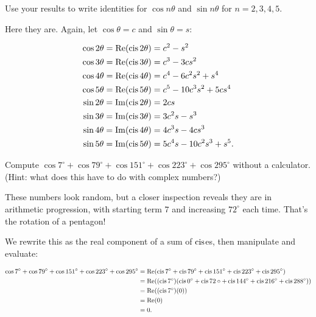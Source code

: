 \documentclass[../key.tex]{subfiles}
\begin{document}
\begin{inner_problem}
\item Use your results to write identities for $\cos n\theta$ and $\sin n\theta$ for $n=2,3,4,5$.
\end{inner_problem}

Here they are. Again, let $\cos\theta = c$ and $\sin\theta = s$:

\begin{align*}
\cos 2\theta = \operatorname{Re}(\operatorname{cis} 2\theta) &= c^2 - s^2 \\
\cos 3\theta = \operatorname{Re}(\operatorname{cis} 3\theta) &= c^3 - 3cs^2 \\
\cos 4\theta = \operatorname{Re}(\operatorname{cis} 4\theta) &= c^4 - 6c^2s^2 + s^4 \\
\cos 5\theta = \operatorname{Re}(\operatorname{cis} 5\theta) &= c^5 - 10c^3s^2 + 5cs^4 \\
\sin 2\theta = \operatorname{Im}(\operatorname{cis} 2\theta) &= 2cs \\
\sin 3\theta = \operatorname{Im}(\operatorname{cis} 3\theta) &= 3c^2s - s^3 \\
\sin 4\theta = \operatorname{Im}(\operatorname{cis} 4\theta) &= 4c^3s - 4cs^3 \\
\sin 5\theta = \operatorname{Im}(\operatorname{cis} 5\theta) &= 5c^4s - 10c^2s^3 + s^5. \\
\end{align*}

\newcommand{\cosdeg}[1] {\cos #1^\circ}

\begin{outer_problem}
\item Compute $\cosdeg{7} + \cosdeg{79} + \cosdeg{151} + \cosdeg{223} + \cosdeg{295}$ without a calculator. (Hint: what does this have to do with complex numbers?)
\end{outer_problem}

These numbers look random, but a closer inspection reveals they are in arithmetic progression, with starting term $7$ and increasing $72^\circ$ each time. That's the rotation of a pentagon!

We rewrite this as the real component of a sum of $\operatorname{cis}$es, then manipulate and evaluate:

\begin{align*}
\cosdeg{7} + \cosdeg{79} + \cosdeg{151} + \cosdeg{223} + \cosdeg{295} &= \Real(\cis 7^\circ + \cis 79^\circ +  \cis 151^\circ +  \cis 223^\circ +  \cis 295^\circ) \\
&= \Real((\cis 7^\circ)(\cis 0^\circ + \cis 72\circ + \cis 144^\circ + \cis 216^\circ + \cis 288^\circ)) \\
&= \Real((\cis 7^\circ)(0)) \\
&= \Real(0) \\
&= 0.
\end{align*}
\end{document}
